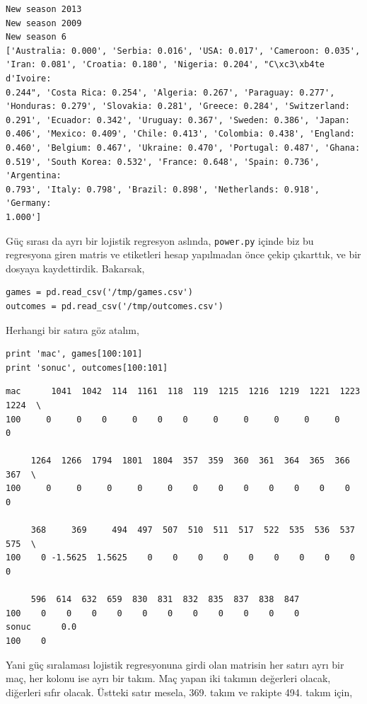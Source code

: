 \documentclass[12pt,fleqn]{article}\usepackage{../../common}
\begin{document}
\begin{verbatim}
New season 2013
New season 2009
New season 6
['Australia: 0.000', 'Serbia: 0.016', 'USA: 0.017', 'Cameroon: 0.035',
'Iran: 0.081', 'Croatia: 0.180', 'Nigeria: 0.204', "C\xc3\xb4te d'Ivoire:
0.244", 'Costa Rica: 0.254', 'Algeria: 0.267', 'Paraguay: 0.277',
'Honduras: 0.279', 'Slovakia: 0.281', 'Greece: 0.284', 'Switzerland:
0.291', 'Ecuador: 0.342', 'Uruguay: 0.367', 'Sweden: 0.386', 'Japan:
0.406', 'Mexico: 0.409', 'Chile: 0.413', 'Colombia: 0.438', 'England:
0.460', 'Belgium: 0.467', 'Ukraine: 0.470', 'Portugal: 0.487', 'Ghana:
0.519', 'South Korea: 0.532', 'France: 0.648', 'Spain: 0.736', 'Argentina:
0.793', 'Italy: 0.798', 'Brazil: 0.898', 'Netherlands: 0.918', 'Germany:
1.000'] 
\end{verbatim}

Güç sırası da ayrı bir lojistik regresyon aslında, \verb!power.py! içinde
biz bu regresyona giren matris ve etiketleri hesap yapılmadan önce çekip
çıkarttık, ve bir dosyaya kaydettirdik. Bakarsak,

\begin{verbatim}
games = pd.read_csv('/tmp/games.csv')
outcomes = pd.read_csv('/tmp/outcomes.csv')
\end{verbatim}

Herhangi bir satıra göz atalım,

\begin{verbatim}
print 'mac', games[100:101]
print 'sonuc', outcomes[100:101]
\end{verbatim}

\begin{verbatim}
mac      1041  1042  114  1161  118  119  1215  1216  1219  1221  1223  1224  \
100     0     0    0     0    0    0     0     0     0     0     0     0   

     1264  1266  1794  1801  1804  357  359  360  361  364  365  366  367  \
100     0     0     0     0     0    0    0    0    0    0    0    0    0   

     368     369     494  497  507  510  511  517  522  535  536  537  575  \
100    0 -1.5625  1.5625    0    0    0    0    0    0    0    0    0    0   

     596  614  632  659  830  831  832  835  837  838  847  
100    0    0    0    0    0    0    0    0    0    0    0  
sonuc      0.0
100    0
\end{verbatim}

Yani güç sıralaması lojistik regresyonuna girdi olan matrisin her satırı
ayrı bir maç, her kolonu ise ayrı bir takım. Maç yapan iki takımın
değerleri olacak, diğerleri sıfır olacak. Üstteki satır mesela, 369. takım
ve rakipte 494. takım için,
\end{document}
